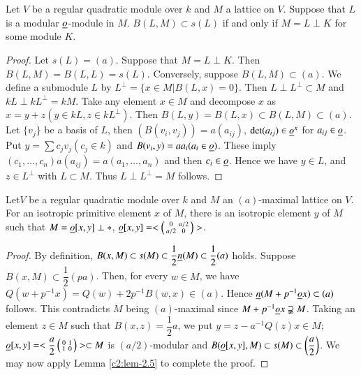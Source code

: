 \begin{lemma}\label{c2:lem-2.5}
Let $V$ be a regular quadratic module over $k$ and $M$ a lattice on
$V$. Suppose that $L$ is a modular $\underline{o}$-module in
$M$. $B(L,M)\subset s(L)$ if and only if $M=L\perp K$ for some module $K$.
\end{lemma}

\begin{proof}
Let $s(L)=(a)$. Suppose that $M=L\perp K$. Then
$B(L,M)=B(L,L)=s(L)$. Conversely, suppose $B(L,M)\subset (a)$. We
define a submodule $L$ by $L^{\perp}=\{x\in M|B(L,x)=0\}$. Then
$L\perp L^{\perp}\subset M$ and $kL\perp kL^{\perp}=kM$. Take any
element $x\in M$ and decompose $x$ as $x=y+z(y\in kL, z\in
kL^{\perp})$. Then $B(L,y)=B(L,x)\subset B(L,M)\subset (a)$. Let
$\{v_{j}\}$ be a basis of $L$, then $(B(v_{i},v_{j}))=a(a_{ij})$,
$\det (a_{ij})\in\underline{o}^{x}$ for $a_{ij}\in\underline{o}$. Put $y=\sum
c_{j}v_{j}(c_{j}\in k)$ and $B(v_{i},y)=aa_{i}(a_{i}\in\underline{o})$. These
imply $(c_{1},\ldots,c_{n})a(a_{ij})=a(a_{1},\ldots,a_{n})$ and then
$c_{i}\in\underline{o}$. Hence we have $y\in L$, and $z\in L^{\perp}$ with
$L\subset M$. Thus $L\perp L^{\perp}=M$ follows.
\end{proof}

\begin{lemma}\label{c2:lem-2.6}
Let\pageoriginale $V$ be a regular quadratic module over $k$ and $M$
an $(a)$-maximal lattice on $V$. For an isotropic primitive element
$x$ of $M$, there is an isotropic element $y$ of $M$ such that
$M=\underline{o}[x,y]\perp \ast$, $\underline{o}[x,y]=<\left(\begin{smallmatrix} 0 &
  a/2\\ a/2 & 0\end{smallmatrix}\right)>$.
\end{lemma}

\begin{proof}
By definition, $B(x,M)\subset s(M)\subset \dfrac{1}{2}\underline{n}(M)\subset
\dfrac{1}{2}(a)$ holds. Suppose $B(x,M)\subset
\dfrac{1}{2}(pa)$. Then, for every $w\in M$, we have
$Q(w+p^{-1}x)=Q(w)+2p^{-1}B(w,x)\in(a)$. Hence
$\underline{n}(M+p^{-1}\underline{o}x)\subset (a)$ follows. This contradicts $M$
being $(a)$-maximal since
$M+p^{-1}\underline{o}x\supsetneqq M$. Taking an element $z\in
M$ such that $B(x,z)=\dfrac{1}{2}a$, we put $y=z-a^{-1}Q(z)x\in M$;
$\underline{o}[x,y]=<\dfrac{a}{2}\left(\begin{smallmatrix} 0 & 1\\ 1 & 0
\end{smallmatrix}\right)>\subset M$ is $(a/2)$-modular and
$B(\underline{o}[x,y],M)\subset s(M)\subset \left(\dfrac{a}{2}\right)$. We
may now apply Lemma \ref{c2:lem-2.5} to complete the proof.
\end{proof}

